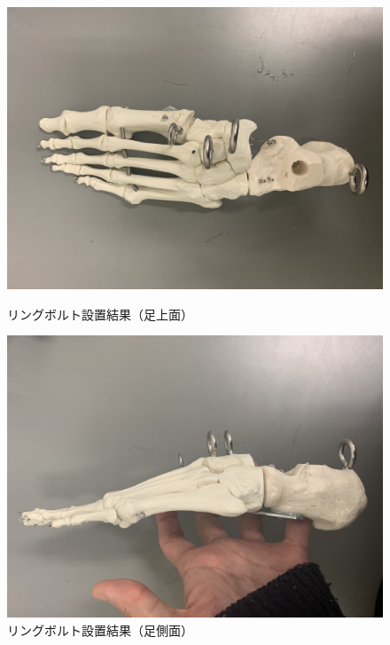 \begin{figure}[h]
    \begin{center}
     \includegraphics[width=0.6\columnwidth,clip]{./2_measurement/foot.eps}
     \caption{リングボルト設置結果（足上面）}
     \label{fig:foot}
    \end{center}
    \begin{center}
     \includegraphics[width=0.6\columnwidth,clip]{./2_measurement/footside.eps}
     \caption{リングボルト設置結果（足側面）}
     \label{fig:footside}
    \end{center}
\end{figure}

